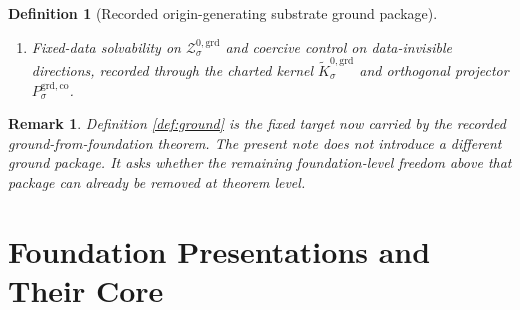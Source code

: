 \documentclass[11pt]{article}
\newcommand{\ForSpace}[1]{\mathcal I_{#1}^{\mathrm{for}}}
\newcommand{\GroundZeroCore}[1]{\mathcal Z_{#1}^{0,\mathrm{grd}}}
\newcommand{\GroundSplit}[1]{\Phi_{#1}^{\mathrm{grd}}}
\newcommand{\GroundCharge}[1]{\mathcal Q_{#1}^{\mathrm{grd}}}
\newcommand{\GroundResidual}[1]{\mathcal R_{#1}^{\mathrm{grd}}}
\newcommand{\GroundEmbed}[1]{\zeta_{#1}^{\mathrm{grd}}}
\newcommand{\GroundKernelCh}[1]{\widetilde K_{#1}^{0,\mathrm{grd}}}
\newcommand{\GroundStateComp}[1]{P_{#1}^{\mathrm{grd,co}}}
\newtheorem{definition}{Definition}
\newtheorem{remark}{Remark}
\begin{document}
\begin{definition}[Recorded origin-generating substrate ground package]
\begin{enumerate}
    \[
    \GroundResidual{\sigma}\bigl(\GroundSplit{\sigma}(z,\eta)\bigr)
    \equiv
    \GroundCharge{\sigma}(\eta),
    \]
    and a smooth observer-compatible exact zero-response realization
    \[
    \GroundEmbed{\sigma}:\ForSpace{\sigma}\hookrightarrow\GroundZeroCore{\sigma}
    \]
    recovering the fixed visible, current, and equilibrium shell data.
    \item Fixed-data solvability on \(\GroundZeroCore{\sigma}\) and coercive control on data-invisible directions, recorded through the charted kernel \(\GroundKernelCh{\sigma}\) and orthogonal projector \(\GroundStateComp{\sigma}\).
\end{enumerate}
\end{definition}

\begin{remark}
Definition \ref{def:ground} is the fixed target now carried by the recorded ground-from-foundation theorem. The present note does not introduce a different ground package. It asks whether the remaining foundation-level freedom above that package can already be removed at theorem level.
\end{remark}

\section{Foundation Presentations and Their Core}
\end{document}
